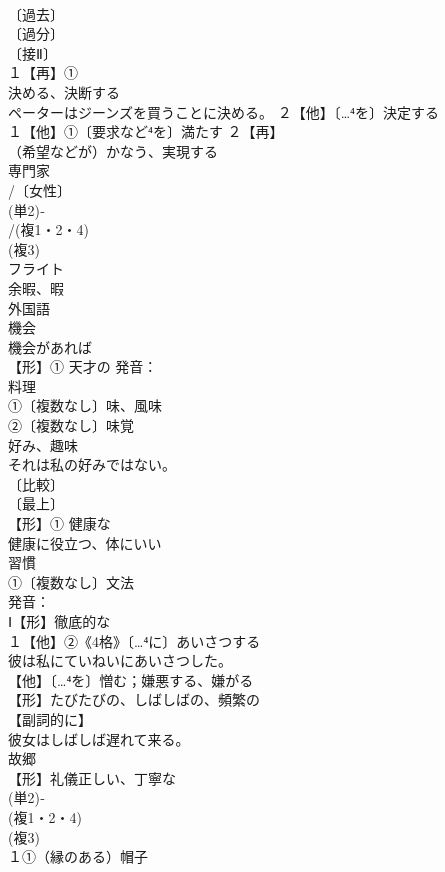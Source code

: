 \documentclass[8pt]{extreport}
\begin{document}
\begin{CJK}{UTF8}{min}
\\	〔過去〕
\\	〔過分〕
\\	〔接Ⅱ〕
\\	１【再】①
\\	決める、決断する 
\\	ペーターはジーンズを買うことに決める。 ２【他】〔…⁴を〕決定する
\\	１【他】①〔要求など⁴を〕満たす ２【再】
\\	（希望などが）かなう、実現する
\\	専門家 
\\	/〔女性〕
\\	(単2)‐
\\	/(複1・2・4)
\\	(複3)
\\	フライト 
\\	余暇、暇
\\	外国語 
\\	機会 
\\	機会があれば
\\	【形】① 天才の 発音：
\\	料理 
\\	①〔複数なし〕味、風味 
\\	②〔複数なし〕味覚　
\\	好み、趣味 
\\	それは私の好みではない。
\\	〔比較〕
\\	〔最上〕
\\	【形】① 健康な 
\\	健康に役立つ、体にいい
\\	習慣
\\	①〔複数なし〕文法 
\\	発音：
\\	Ⅰ【形】徹底的な
\\	１【他】②《4格》〔…⁴に〕あいさつする 
\\	彼は私にていねいにあいさつした。
\\	【他】〔…⁴を〕憎む；嫌悪する、嫌がる 
\\	【形】たびたびの、しばしばの、頻繁の 
\\	【副詞的に】
\\	彼女はしばしば遅れて来る。
\\	故郷
\\	【形】礼儀正しい、丁寧な 
\\	(単2)‐
\\	(複1・2・4)
\\	(複3)
\\	１①（縁のある）帽子 

\end{CJK}
\end{document}
